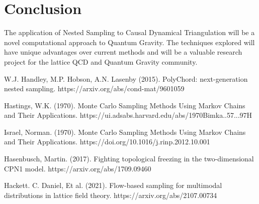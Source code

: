 \documentclass[a4paper]{article}
\begin{document}
    
\section{Conclusion}
The application of Nested Sampling to Causal Dynamical Triangulation will be a novel computational approach to Quantum Gravity. The techniques explored will have unique advantages over current methods and will be a valuable research project for the lattice QCD and Quantum Gravity community.


\newpage
\begin{thebibliography}{9}
W.J. Handley, M.P. Hobson, A.N. Lasenby (2015). PolyChord: next-generation nested sampling. https://arxiv.org/abs/cond-mat/9601059

Hastings, W.K. (1970). Monte Carlo Sampling Methods Using Markov Chains and Their Applications. https://ui.adsabs.harvard.edu/abs/1970Bimka..57...97H

Israel, Norman. (1970). Monte Carlo Sampling Methods Using Markov
Chains and Their
 Applications. https://doi.org/10.1016/j.rinp.2012.10.001

Hasenbusch, Martin. (2017). Fighting topological freezing in the
two-dimensional CPN1 model. https://arxiv.org/abs/1709.09460

Hackett. C. Daniel, Et al. (2021). Flow-based sampling for multimodal
distributions in lattice field theory. https://arxiv.org/abs/2107.00734
\end{thebibliography}
\end{document}
